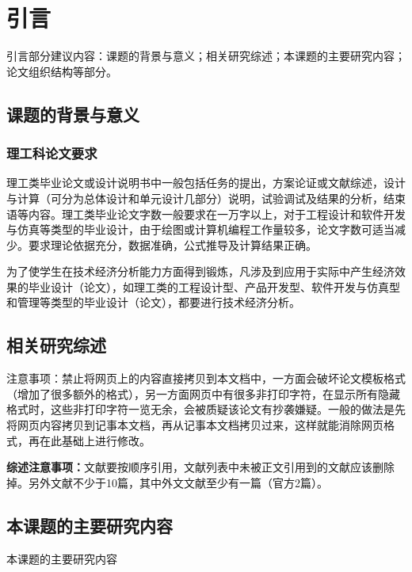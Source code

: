 ﻿\documentclass{scutthesis} %
\begin{document}
\frontmatter
{}
\makeUndergraduateCover    %

\makedisclaim %

\maketableofcontents        %

\makeabstract       %
\mainmatter
\chapter{引言}
引言部分建议内容：课题的背景与意义；相关研究综述；本课题的主要研究内容；论文组织结构等部分。
\section{课题的背景与意义}
\subsection{理工科论文要求}
理工类毕业论文或设计说明书中一般包括任务的提出，方案论证或文献综述，设计与计算（可分为总体设计和单元设计几部分）说明，试验调试及结果的分析，结束语等内容。理工类毕业论文字数一般要求在一万字以上，对于工程设计和软件开发与仿真等类型的毕业设计，由于绘图或计算机编程工作量较多，论文字数可适当减少。要求理论依据充分，数据准确，公式推导及计算结果正确。

为了使学生在技术经济分析能力方面得到锻炼，凡涉及到应用于实际中产生经济效果的毕业设计（论文），如理工类的工程设计型、产品开发型、软件开发与仿真型和管理等类型的毕业设计（论文），都要进行技术经济分析。

\section{相关研究综述}
注意事项：禁止将网页上的内容直接拷贝到本文档中，一方面会破坏论文模板格式（增加了很多额外的格式），另一方面网页中有很多非打印字符，在显示所有隐藏格式时，这些非打印字符一览无余，会被质疑该论文有抄袭嫌疑。一般的做法是先将网页内容拷贝到记事本文档，再从记事本文档拷贝过来，这样就能消除网页格式，再在此基础上进行修改。

\textbf{综述注意事项：}文献要按顺序引用，文献列表中未被正文引用到的文献应该删除掉。另外文献不少于10篇，其中外文文献至少有一篇（官方2篇）。

\section{本课题的主要研究内容}
本课题的主要研究内容\\
\end{document}
